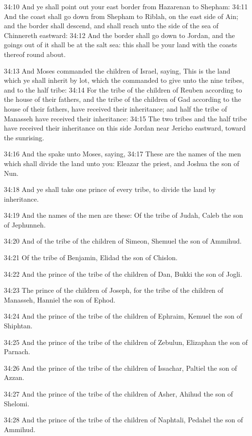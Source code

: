 34:10 And ye shall point out your east border from Hazarenan to
Shepham: 34:11 And the coast shall go down from Shepham to Riblah, on
the east side of Ain; and the border shall descend, and shall reach
unto the side of the sea of Chinnereth eastward: 34:12 And the border
shall go down to Jordan, and the goings out of it shall be at the salt
sea: this shall be your land with the coasts thereof round about.

34:13 And Moses commanded the children of Israel, saying, This is the
land which ye shall inherit by lot, which the \LORD commanded to give
unto the nine tribes, and to the half tribe: 34:14 For the tribe of
the children of Reuben according to the house of their fathers, and
the tribe of the children of Gad according to the house of their
fathers, have received their inheritance; and half the tribe of
Manasseh have received their inheritance: 34:15 The two tribes and the
half tribe have received their inheritance on this side Jordan near
Jericho eastward, toward the sunrising.

34:16 And the \LORD spake unto Moses, saying, 34:17 These are the names
of the men which shall divide the land unto you: Eleazar the priest,
and Joshua the son of Nun.

34:18 And ye shall take one prince of every tribe, to divide the land
by inheritance.

34:19 And the names of the men are these: Of the tribe of Judah, Caleb
the son of Jephunneh.

34:20 And of the tribe of the children of Simeon, Shemuel the son of
Ammihud.

34:21 Of the tribe of Benjamin, Elidad the son of Chislon.

34:22 And the prince of the tribe of the children of Dan, Bukki the
son of Jogli.

34:23 The prince of the children of Joseph, for the tribe of the
children of Manasseh, Hanniel the son of Ephod.

34:24 And the prince of the tribe of the children of Ephraim, Kemuel
the son of Shiphtan.

34:25 And the prince of the tribe of the children of Zebulun,
Elizaphan the son of Parnach.

34:26 And the prince of the tribe of the children of Issachar, Paltiel
the son of Azzan.

34:27 And the prince of the tribe of the children of Asher, Ahihud the
son of Shelomi.

34:28 And the prince of the tribe of the children of Naphtali, Pedahel
the son of Ammihud.

